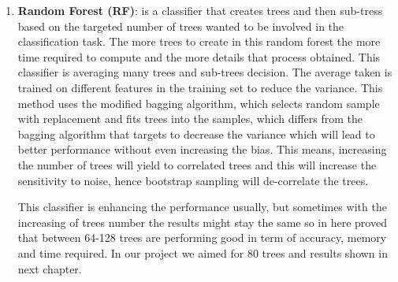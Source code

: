 \begin{enumerate}
\item \textbf{Random Forest (RF)}: is a classifier that creates trees and then sub-tress based on the targeted number of trees wanted to be involved in the classification task.
The more trees to create in this random forest the more time required to compute and the more details that process obtained.
This classifier is averaging many trees and sub-trees decision.
The average taken is trained on different features in the training set to reduce the variance.
This method uses the modified bagging algorithm, which selects random sample with replacement and fits trees into the samples, which differs from the bagging algorithm that targets to decrease the variance which will lead to better performance without even increasing the bias.
This means, increasing the number of trees will yield to correlated trees and this will increase the sensitivity to noise, hence bootstrap sampling will de-correlate the trees.

This classifier is enhancing the performance usually, but sometimes with the increasing of trees number the results might stay the same so in here \cite{oshiro2012many} proved that between 64-128 trees are performing good in term of accuracy, memory and time required.
In our project we aimed for 80 trees and results shown in next chapter. 
\end{enumerate} 
